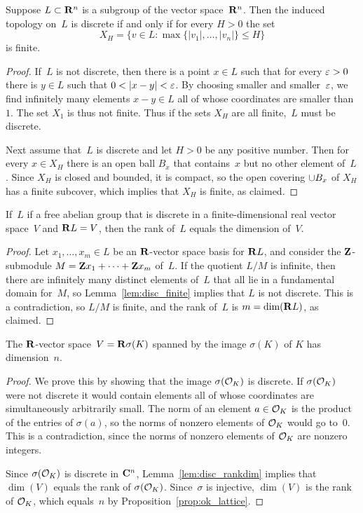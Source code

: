 \begin{lemma}\label{lem:disc_finite}
Suppose $L\subset \mathbf{R}^n$ is a subgroup of the vector space~$\mathbf{R}^n$.
Then the induced topology on~$L$ is discrete if and only
if for every  $H>0$ the set 
$$
  X_H = \{v \in L : \max\{|v_1|,\ldots, |v_n|\} \leq H \}
$$
is finite. 
\end{lemma}
\begin{proof}
If~$L$ is not discrete, then there is a point $x \in L$ such that
for every $\varepsilon>0$ there is $y\in L$ such that
$0 < |x-y|<\varepsilon$. By choosing smaller and smaller~$\varepsilon$,
we find infinitely many elements $x-y\in L$
all of whose coordinates are smaller than~$1$. 
The set $X_1$ is thus not finite.   Thus if the sets
$X_H$ are all finite,~$L$ must be discrete. 

Next assume that~$L$ is discrete and let $H>0$ be any positive 
number.
Then for every $x\in X_H$ there is an open ball $B_x$
that contains~$x$ but no other element of~$L$.
Since $X_H$ is closed and bounded, it is compact, so 
the open covering $\cup B_x$ of $X_H$ has a finite
subcover, which implies that $X_H$ is finite, as claimed.
\end{proof}

\begin{lemma}\label{lem:disc_rankdim}
If~$L$ if a free abelian group that is
discrete in a finite-dimensional
real vector space~$V$ and $\mathbf{R}{}L=V$, then the rank of~$L$ 
equals the dimension of~$V$.  
\end{lemma}
\begin{proof}
  Let $x_1,\ldots, x_m \in L$ be an $\mathbf{R}$-vector space basis for
  $\mathbf{R}{}L$, and consider the $\mathbf{Z}$-submodule $M=\mathbf{Z} x_1 + \cdots + \mathbf{Z}
  x_m$ of~$L$.  If the quotient $L/M$ is infinite, then there are
  infinitely many distinct elements of~$L$ that all lie in a
  fundamental domain for~$M$, so Lemma~\ref{lem:disc_finite} implies
  that $L$ is not discrete.  This is a contradiction, so $L/M$ is
  finite, and the rank of~$L$ is $m=\dim(\mathbf{R}{}L)$, as claimed.
\end{proof}

\begin{proposition}
The $\mathbf{R}$-vector space~$V=\mathbf{R}\sigma(K)$ spanned by the image
$\sigma(K)$ of $K$ has dimension~$n$.
\end{proposition}
\begin{proof}
We prove this by showing that the image $\sigma(\mathcal{O}_K)$ is discrete. If
$\sigma(\mathcal{O}_K)$ were not discrete it would contain elements all of
whose coordinates are simultaneously arbitrarily small.  The norm of
an element $a\in \mathcal{O}_K$ is the product of the entries of $\sigma(a)$,
so the norms of nonzero elements of $\mathcal{O}_K$ would go to~$0$.  This is a
contradiction, since the norms of nonzero elements of $\mathcal{O}_K$ are
 nonzero integers.

Since $\sigma(\mathcal{O}_K)$ is discrete in $\mathbf{C}^n$, Lemma~\ref{lem:disc_rankdim}
implies that $\dim(V)$ equals the rank of $\sigma(\mathcal{O}_K)$.  Since~$\sigma$
is injective, $\dim(V)$ is the rank of $\mathcal{O}_K$, which equals~$n$ by
Proposition~\ref{prop:ok_lattice}.
\end{proof}

